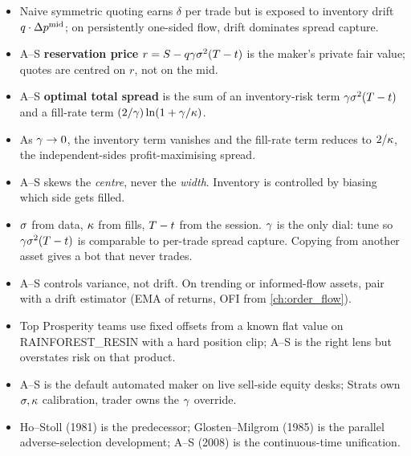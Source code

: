 \begin{itemize}
  \item Naive symmetric quoting earns $\delta$ per trade but is
  exposed to inventory drift $q \cdot \Delta p^{\mathrm{mid}}$; on
  persistently one-sided flow, drift dominates spread capture.
  \item A--S \textbf{reservation price}
  $r = S - q\gamma\sigma^2(T - t)$ is the maker's
  private fair value; quotes are centred on $r$, not on the mid.
  \item A--S \textbf{optimal total spread} is the sum of an
  inventory-risk term $\gamma\sigma^2(T - t)$ and a fill-rate
  term $(2/\gamma)\ln(1 + \gamma/\kappa)$.
  \item As $\gamma \to 0$, the inventory term vanishes and the
  fill-rate term reduces to $2/\kappa$, the independent-sides
  profit-maximising spread.
  \item A--S skews the \emph{centre}, never the \emph{width}.
  Inventory is controlled by biasing which side gets filled.
  \item $\sigma$ from data, $\kappa$ from fills, $T - t$ from
  the session. $\gamma$ is the only dial: tune so
  $\gamma\sigma^2(T - t)$ is comparable to per-trade spread
  capture. Copying from another asset gives a bot that never
  trades.
  \item A--S controls variance, not drift. On trending or
  informed-flow assets, pair with a drift estimator (EMA of
  returns, OFI from \cref{ch:order_flow}).
  \item Top Prosperity teams use fixed offsets from a known flat
  value on RAINFOREST\_RESIN with a hard position clip; A--S is
  the right lens but overstates risk on that product.
  \item A--S is the default automated maker on live sell-side
  equity desks; Strats own $\sigma, \kappa$ calibration, trader
  owns the $\gamma$ override.
  \item Ho--Stoll (1981) is the predecessor; Glosten--Milgrom
  (1985) is the parallel adverse-selection development; A--S
  (2008) is the continuous-time unification.
\end{itemize}
